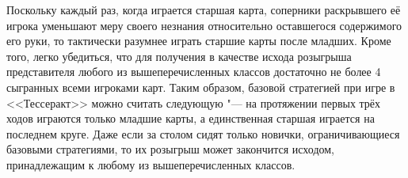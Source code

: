 Поскольку каждый раз, когда играется старшая карта, соперники раскрывшего её игрока уменьшают меру своего незнания относительно оставшегося содержимого его руки, то тактически разумнее играть старшие карты после младших. Кроме того, легко убедиться, что для получения в качестве исхода розыгрыша представителя любого из вышеперечисленных классов достаточно не более 4 сыгранных всеми игроками карт. Таким образом, базовой стратегией при игре в <<Тессеракт>> можно считать следующую "--- на протяжении первых трёх ходов играются только младшие карты, а единственная старшая играется на последнем круге. Даже если за столом сидят только новички, ограничивающиеся базовыми стратегиями, то их розыгрыш может закончится исходом, принадлежащим к любому из вышеперечисленных классов.

%
%
%
